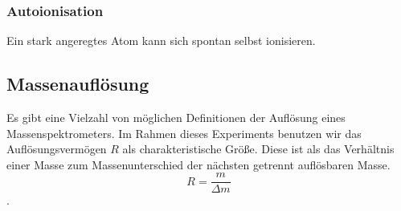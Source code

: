 \subsubsection{Autoionisation}
Ein stark angeregtes Atom kann sich spontan selbst ionisieren. 
\subsection{Massenauflösung}
Es gibt eine Vielzahl von möglichen Definitionen der Auflösung eines Massenspektrometers. Im Rahmen dieses Experiments benutzen wir das Auflösungsvermögen $R$ als charakteristische Größe. Diese ist als das Verhältnis einer Masse zum Massenunterschied der nächsten getrennt auflösbaren Masse. $$R = \frac{m}{\Delta m}$$. %